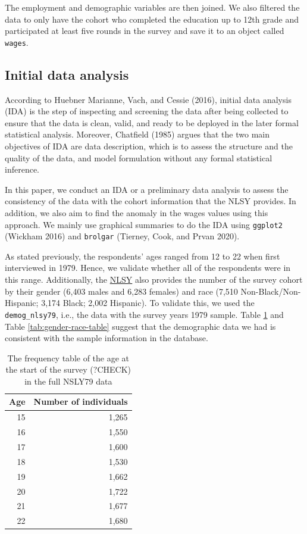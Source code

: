 \documentclass{article}
\begin{document}
The employment and demographic variables are then joined. We also filtered the data to only have the cohort who completed the education up to 12th grade and participated at least five rounds in the survey and save it to an object called \texttt{wages}.

\hypertarget{ida}{%
\subsection{Initial data analysis}\label{ida}}

According to Huebner Marianne, Vach, and Cessie (2016), initial data analysis (IDA) is the step of inspecting and screening the data after being collected to ensure that the data is clean, valid, and ready to be deployed in the later formal statistical analysis. Moreover, Chatfield (1985) argues that the two main objectives of IDA are data description, which is to assess the structure and the quality of the data, and model formulation without any formal statistical inference.

In this paper, we conduct an IDA or a preliminary data analysis to assess the consistency of the data with the cohort information that the NLSY provides. In addition, we also aim to find the anomaly in the wages values using this approach. We mainly use graphical summaries to do the IDA using \texttt{ggplot2} (Wickham 2016) and \texttt{brolgar} (Tierney, Cook, and Prvan 2020).

As stated previously, the respondents' ages ranged from 12 to 22 when first interviewed in 1979. Hence, we validate whether all of the respondents were in this range. Additionally, the \href{https://www.nlsinfo.org/content/cohorts/nlsy79/intro-to-the-sample/nlsy79-sample-introduction}{NLSY} also provides the number of the survey cohort by their gender (6,403 males and 6,283 females) and race (7,510 Non-Black/Non-Hispanic; 3,174 Black; 2,002 Hispanic). To validate this, we used the \texttt{demog\_nlsy79}, i.e., the data with the survey years 1979 sample. Table \ref{tab:age-table} and Table \ref{tab:gender-race-table} suggest that the demographic data we had is consistent with the sample information in the database.

\begin{table}

\caption{\label{tab:age-table}The frequency table of the age at the start of the survey (?CHECK) in the full NSLY79 data}
\centering
\begin{tabular}[t]{rr}
\toprule
Age & Number of individuals\\
\midrule
15 & 1,265\\
16 & 1,550\\
17 & 1,600\\
18 & 1,530\\
19 & 1,662\\
20 & 1,722\\
21 & 1,677\\
22 & 1,680\\
\bottomrule
\end{tabular}
\end{table}
\end{document}
